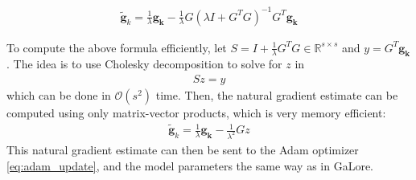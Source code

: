\begin{eqnarray}
 \mathbf{\tilde{g}}_{k} = \frac{1}{\lambda}\mathbf{g_{k}} - \frac{1}{\lambda}G\left(\lambda I + G^{T}G\right)^{-1}G^{T}\mathbf{g_{k}}
\end{eqnarray}

To compute the above formula efficiently, let \(S = I + \frac{1}{\lambda}G^{T}G \in \mathbb{R}^{s\times s}\) and \(y = G^T\mathbf{g_{k}}\). The idea is to use Cholesky decomposition to solve for \(z\) in
\begin{eqnarray}
S z = y
\end{eqnarray}
which can be done in \(\mathcal{O}(s^2)\) time. Then, the natural gradient estimate can be computed using only matrix-vector products, which is very memory efficient:
\begin{eqnarray}
 \mathbf{\tilde{g}}_{k} = \frac{1}{\lambda}\mathbf{g_{k}} - \frac{1}{\lambda^{2}}Gz
\end{eqnarray}
This natural gradient estimate can then be sent to the Adam optimizer \ref{eq:adam_update}, and the model parameters the same way as in GaLore.